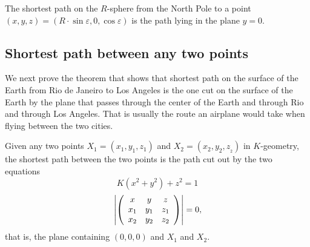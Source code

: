 \documentclass{ximera}
\begin{document}
\begin{theorem}
The shortest path on the $R$-sphere from the North Pole to a
point $\left(  x,y,z\right)  =\left(  R\cdot %
\sin \varepsilon,0,\cos \varepsilon\right)  $ is the path lying
in the plane $y=0$.
\end{theorem}



\subsection*{Shortest path between any two points}

We next prove the theorem that shows that shortest path on the surface
of the Earth from Rio de Janeiro to Los Angeles is the one cut on the
surface of the Earth by the plane that passes through the center of
the Earth and through Rio and through Los Angeles. That is usually the
route an airplane would take when flying between the two cities.

\begin{theorem}
Given any two points $X_{1}=\left(  x_{1},y_{1},z_{1}\right)  $
and $X_{2}=\left(  x_{2},y_{2},z_{_{2}}\right)  $ in $K$-geometry, the
shortest path between the two points is the path cut out by the two equations%
\[
K\left(  x^{2}+y^{2}\right)  +z^{2}=1
\]%
\begin{equation}
\left\vert \left(
\begin{array}
[c]{ccc}%
x & y & z\\
x_{1} & y_{1} & z_{1}\\
x_{2} & y_{2} & z_{2}%
\end{array}
\right)  \right\vert =0, \label{63}%
\end{equation}
that is, the plane containing $\left(  0,0,0\right)  $ and $X_{1}$ and $X_{2}$.
\end{theorem}
\end{document}
